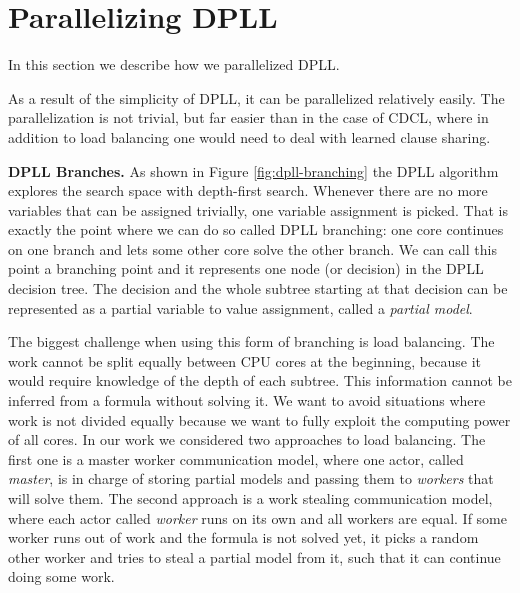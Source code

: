 \documentclass[letterpaper]{article}
\newcommand{\mypar}[1]{{\bf #1.}}
\begin{document}
\section{Parallelizing DPLL}\label{sec:parallel_dpll}
In this section we describe how we parallelized DPLL.

As a result of the simplicity of DPLL, it can be parallelized relatively easily.
The parallelization is not trivial, but far easier than in the case of CDCL, where in addition to load balancing one would need to deal with learned clause sharing.

\mypar{DPLL Branches}
As shown in Figure \ref{fig:dpll-branching} the DPLL algorithm explores the search space with depth-first search.
Whenever there are no more variables that can be assigned trivially, one variable assignment is picked.
That is exactly the point where we can do so called DPLL branching: one core continues on one branch and lets some other core solve the other branch.
We can call this point a branching point and it represents one node (or decision) in the DPLL decision tree.
The decision and the whole subtree starting at that decision can be represented as a partial variable to value assignment, called a \textit{partial model}.

The biggest challenge when using this form of branching is load balancing.
The work cannot be split equally between CPU cores at the beginning, because it would require knowledge of the depth of each subtree.
This information cannot be inferred from a formula without solving it.
We want to avoid situations where work is not divided equally because we want to fully exploit the computing power of all cores.
In our work we considered two approaches to load balancing.
The first one is a master worker communication model, where one actor, called \textit{master}, is in charge of storing partial models and passing them to \textit{workers} that will solve them.
The second approach is a work stealing communication model, where each actor called \textit{worker} runs on its own and all workers are equal.
If some worker runs out of work and the formula is not solved yet, it picks a random other worker and tries to steal a partial model from it, such that it can continue doing some work.
\end{document}
